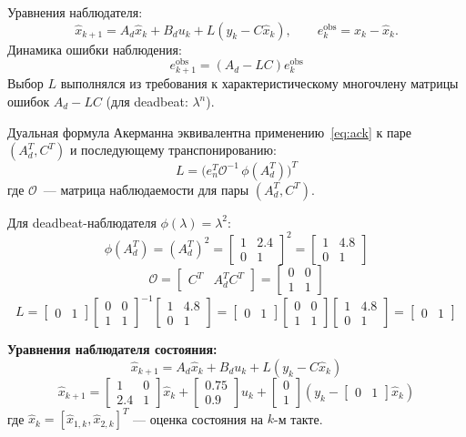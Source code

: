 Уравнения наблюдателя:
\[
 \hat x_{k+1}=A_d \hat x_k + B_d u_k + L( y_k - C\hat x_k ),\qquad 
 e_k^{\text{obs}}=x_k-\hat x_k.
\]
Динамика ошибки наблюдения:
\[
e_{k+1}^{\text{obs}} = (A_d - LC) e_k^{\text{obs}}
\]
Выбор $L$ выполнялся из требования к характеристическому многочлену матрицы ошибок $A_d-LC$ (для deadbeat: $\lambda^n$). 

Дуальная формула Акерманна эквивалентна применению~\eqref{eq:ack} к паре $(A_d^T,C^T)$ и последующему транспонированию: 
\[
L=\bigl(e_n^T \mathcal O^{-1}\, \phi(A_d^T)\bigr)^T
\]
где $\mathcal O$~--- матрица наблюдаемости для пары $(A_d^T,C^T)$.

Для deadbeat-наблюдателя $\phi(\lambda)=\lambda^2$:
\[
\phi(A_d^T) = (A_d^T)^2 = \begin{bmatrix}1 & 2.4\\ 0 & 1\end{bmatrix}^2 = \begin{bmatrix}1 & 4.8\\ 0 & 1\end{bmatrix}
\]
\[
\mathcal O = \begin{bmatrix}C^T & A_d^T C^T\end{bmatrix} = \begin{bmatrix}0 & 0\\ 1 & 1\end{bmatrix}
\]
\[
L = \begin{bmatrix}0 & 1\end{bmatrix} \begin{bmatrix}0 & 0\\ 1 & 1\end{bmatrix}^{-1} \begin{bmatrix}1 & 4.8\\ 0 & 1\end{bmatrix} = \begin{bmatrix}0 & 1\end{bmatrix} \begin{bmatrix}0 & 0\\ 1 & 1\end{bmatrix} \begin{bmatrix}1 & 4.8\\ 0 & 1\end{bmatrix} = \begin{bmatrix}0 & 1\end{bmatrix}
\]

\textbf{Уравнения наблюдателя состояния:}
\[
\hat x_{k+1} = A_d \hat x_k + B_d u_k + L(y_k - C\hat x_k)
\]
\[
\hat x_{k+1} = \begin{bmatrix}1 & 0\\ 2.4 & 1\end{bmatrix} \hat x_k + \begin{bmatrix}0.75\\ 0.9\end{bmatrix} u_k + \begin{bmatrix}0\\ 1\end{bmatrix} (y_k - \begin{bmatrix}0 & 1\end{bmatrix} \hat x_k)
\]
где $\hat x_k = [\hat x_{1,k}, \hat x_{2,k}]^T$ — оценка состояния на $k$-м такте.

